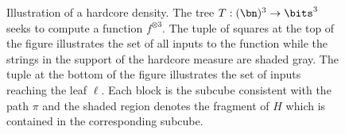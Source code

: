\begin{figure}[h!]
    \captionsetup{width=.9\linewidth}
    \caption{Illustration of a hardcore density. The tree $T:(\bn)^3\to\bits^3$ seeks to compute a function $f^{\otimes 3}$. The tuple of squares at the top of the figure illustrates the set of all inputs to the function while the strings in the support of the hardcore measure are shaded gray. The tuple at the bottom of the figure illustrates the set of inputs reaching the leaf $\ell$. Each block is the subcube consistent with the path $\pi$ and the shaded region denotes the fragment of $H$ which is contained in the corresponding subcube. }
    \label{fig:hardcore}
\end{figure}
